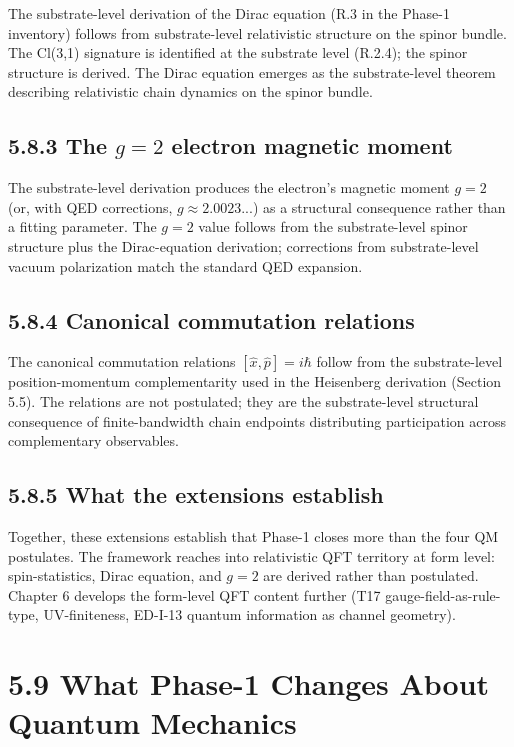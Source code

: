 \documentclass[11pt]{book}
\begin{document}
The substrate-level derivation of the Dirac equation (R.3 in the Phase-1 inventory) follows from substrate-level relativistic structure on the spinor bundle. The Cl(3,1) signature is identified at the substrate level (R.2.4); the spinor structure is derived. The Dirac equation emerges as the substrate-level theorem describing relativistic chain dynamics on the spinor bundle.

\subsection{5.8.3 The $g=2$ electron magnetic moment}

The substrate-level derivation produces the electron's magnetic moment $g=2$ (or, with QED corrections, $g \approx 2.0023...$) as a structural consequence rather than a fitting parameter. The $g=2$ value follows from the substrate-level spinor structure plus the Dirac-equation derivation; corrections from substrate-level vacuum polarization match the standard QED expansion.

\subsection{5.8.4 Canonical commutation relations}

The canonical commutation relations $[\hat x, \hat p] = i\hbar$ follow from the substrate-level position-momentum complementarity used in the Heisenberg derivation (Section 5.5). The relations are not postulated; they are the substrate-level structural consequence of finite-bandwidth chain endpoints distributing participation across complementary observables.

\subsection{5.8.5 What the extensions establish}

Together, these extensions establish that Phase-1 closes more than the four QM postulates. The framework reaches into relativistic QFT territory at form level: spin-statistics, Dirac equation, and $g=2$ are derived rather than postulated. Chapter 6 develops the form-level QFT content further (T17 gauge-field-as-rule-type, UV-finiteness, ED-I-13 quantum information as channel geometry).

\section{5.9 What Phase-1 Changes About Quantum Mechanics}
\end{document}
